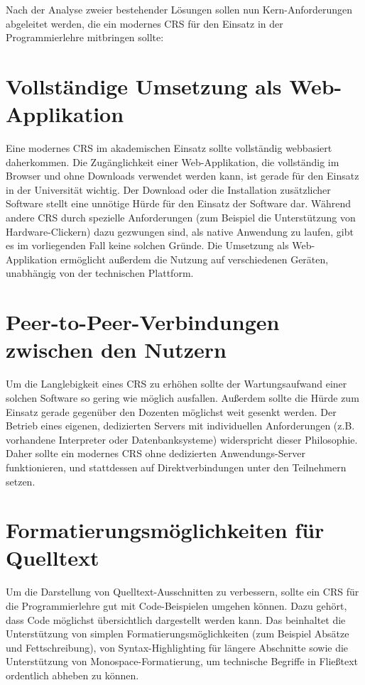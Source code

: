 Nach der Analyse zweier bestehender Lösungen sollen nun Kern-Anforderungen abgeleitet werden, die ein modernes CRS für den Einsatz in der Programmierlehre mitbringen sollte:

\section{Vollständige Umsetzung als Web-Applikation}
\label{chap:webbasiert}
Eine modernes CRS im akademischen Einsatz sollte vollständig webbasiert daherkommen. Die Zugänglichkeit einer Web-Applikation, die vollständig im Browser und ohne Downloads verwendet werden kann, ist gerade für den Einsatz in der Universität wichtig. Der Download oder die Installation zusätzlicher Software stellt eine unnötige Hürde für den Einsatz der Software dar. Während andere CRS durch spezielle Anforderungen (zum Beispiel die Unterstützung von Hardware-Clickern) dazu gezwungen sind, als native Anwendung zu laufen, gibt es im vorliegenden Fall keine solchen Gründe. Die Umsetzung als Web-Applikation ermöglicht außerdem die Nutzung auf verschiedenen Geräten, unabhängig von der technischen Plattform.

\section{Peer-to-Peer-Verbindungen zwischen den Nutzern}
\label{chap:anforderung_p2p}
Um die Langlebigkeit eines CRS zu erhöhen sollte der Wartungsaufwand einer solchen Software so gering wie möglich ausfallen. Außerdem sollte die Hürde zum Einsatz gerade gegenüber den Dozenten möglichst weit gesenkt werden. Der Betrieb eines eigenen, dedizierten Servers mit individuellen Anforderungen (z.B. vorhandene Interpreter oder Datenbanksysteme) widerspricht dieser Philosophie. Daher sollte ein modernes CRS ohne dedizierten Anwendungs-Server funktionieren, und stattdessen auf Direktverbindungen unter den Teilnehmern setzen.

\section{Formatierungsmöglichkeiten für Quelltext}
\label{chap:codeformatierung}
Um die Darstellung von Quelltext-Ausschnitten zu verbessern, sollte ein CRS für die Programmierlehre gut mit Code-Beispielen umgehen können. Dazu gehört, dass Code möglichst übersichtlich dargestellt werden kann. Das beinhaltet die Unterstützung von simplen Formatierungsmöglichkeiten (zum Beispiel Absätze und Fettschreibung), von Syntax-Highlighting für längere Abschnitte sowie die Unterstützung von Monospace-Formatierung, um technische Begriffe in Fließtext ordentlich abheben zu können.

